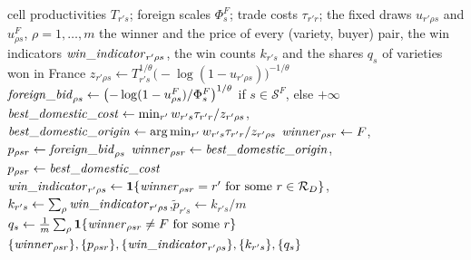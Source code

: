 \begin{algorithm}[H]
\caption{\textsc{RicardianCompetition}: the winner of every variety for every buyer, with the foreign competitor}
\label{alg:ricardian}
\small
\begin{algorithmic}[1]
\Require cell productivities $T_{r's}$; foreign scales $\Phi^F_s$; trade costs $\tau_{r'r}$; the fixed draws $u_{r'\rho s}$ and $u^F_{\rho s}$, $\rho=1,\dots,m$
\Ensure the winner and the price of every (variety, buyer) pair, the win indicators $\mathit{win\_indicator}_{r'\rho s}$, the win counts $k_{r's}$ and the shares $q_s$ of varieties won in France
        \State $z_{r'\rho s}\gets T_{r's}^{1/\theta}\bigl(-\log(1-u_{r'\rho s})\bigr)^{-1/\theta}$
    \EndFor
    \State $\mathit{foreign\_bid}_{\rho s}\gets\bigl(-\log(1-u^F_{\rho s})/\Phi^F_s\bigr)^{1/\theta}$ if $s\in\mathcal{S}^F$, else $+\infty$
        \State $\mathit{best\_domestic\_cost}\gets\min_{r'} w_{r's}\tau_{r'r}/z_{r'\rho s}$,\quad
          $\mathit{best\_domestic\_origin}\gets\arg\min_{r'} w_{r's}\tau_{r'r}/z_{r'\rho s}$
            \State $\mathit{winner}_{\rho sr}\gets F$,\quad $p_{\rho sr}\gets\mathit{foreign\_bid}_{\rho s}$
        \Else
            \State $\mathit{winner}_{\rho sr}\gets\mathit{best\_domestic\_origin}$,\quad $p_{\rho sr}\gets\mathit{best\_domestic\_cost}$
        \EndIf
    \EndFor
\EndFor
{}
\State $\mathit{win\_indicator}_{r'\rho s}\gets\mathbf{1}\{\mathit{winner}_{\rho sr}=r'\ \text{for some }r\in\mathcal{R}_D\}$,\quad
  $k_{r's}\gets\sum_\rho\mathit{win\_indicator}_{r'\rho s}$,\quad $\tilde p_{r's}\gets k_{r's}/m$
\State $q_s\gets\frac1m\sum_\rho\mathbf{1}\{\mathit{winner}_{\rho sr}\neq F\ \text{for some }r\}$
\State \Return $\{\mathit{winner}_{\rho sr}\},\{p_{\rho sr}\},\{\mathit{win\_indicator}_{r'\rho s}\},\{k_{r's}\},\{q_s\}$
\end{algorithmic}
\end{algorithm}



